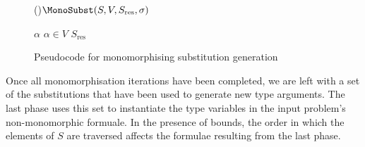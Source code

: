 \documentclass[runningheads]{llncs}
\begin{document}
\begin{figure}[t!]
   \begin{algorithm}[H]


   \Fn(){\(\MonoSubst(S, V, S_{\text{res}}, \sigma)\)}{


   \BlankLine

   \eIf{\(V = \emptyset\)}{
    \Return \(S_{\text{res}}\cup\{\sigma\}\)\;%
   }
   {
      \Let \(\alpha \) \ST \(\alpha\in V\)\;
      \Return \(S_{\text{res}}\)\;
   }
   }


\end{algorithm}
\caption{Pseudocode for monomorphising substitution generation}
\label{mono_substs}
\end{figure}

Once all monomorphisation iterations have been completed, we are left with a set of the substitutions that have been used to generate new type arguments. The last phase uses this set to instantiate the type variables in the input problem's non-monomorphic formuale. In the presence of bounds, the order in which the elements of \(S\) are traversed affects the formulae resulting from the last phase. %
\end{document}
